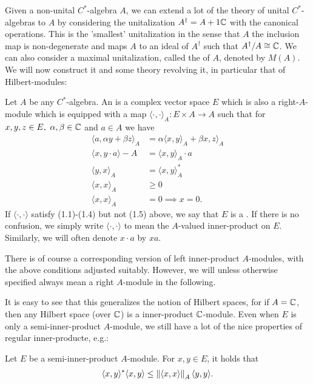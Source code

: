 Given a non-unital $C^*$-algebra $A$, we can extend a lot of the theory of unital $C^*$-algebras to $A$ by considering the unitalization $A^\dagger = A + 1\mathbb{C}$ with the canonical operations. This is the 'smallest' unitalization in the sense that $A$ the inclusion map is non-degenerate and maps $A$ to an ideal of $A^\dagger$ such that $A^\dagger/A \cong \mathbb{C}$. We can also consider a maximal unitalization, called the  of $A$, denoted by $M(A)$. We will now construct it and some theory revolving it, in particular that of Hilbert-modules:
\begin{definition}
	Let $A$ be any $C^*$-algebra. An  is a complex vector space $E$ which is also a right-$A$-module which is equipped with a map $\langle \cdot, \cdot\rangle_A \colon E \times A \to A$ such that for $x,y,z \in E, \ \alpha,\beta \in \mathbb{C}$ and $a \in A$ we have
	\begin{align}
		\langle a , \alpha y + \beta z \rangle_A &= \alpha \langle x,y\rangle_A+\beta x,z \rangle_A\\
		\langle x , y \cdot a \rangle-A &= \langle x,y\rangle_A \cdot a\\
		\langle y,x \rangle_A &= \langle x,y\rangle_A^*\\
		\langle x,x \rangle_A &\geq 0\\
		\langle x,x \rangle_A &= 0 \implies x = 0. 
	\end{align}
	If $\langle \cdot , \cdot \rangle$ satisfy (1.1)-(1.4) but not (1.5) above, we say that $E$ is a . If there is no confusion, we simply write $\langle \cdot, \cdot \rangle$ to mean the $A$-valued inner-product on $E$. Similarly, we will often denote $x \cdot a$ by $xa$. 

	There is of course a corresponding version of left inner-product $A$-modules, with the above conditions adjusted suitably. However, we will unless otherwise specified always mean a right $A$-module in the following.
	\label{mult:defmod}
\end{definition}
It is easy to see that this generalizes the notion of Hilbert spaces, for if $A= \mathbb{C}$, then any Hilbert space (over $\mathbb{C}$) is a inner-product $\mathbb{C}$-module. Even when $E$ is only a semi-inner-product $A$-module, we still have a lot of the nice properties of regular inner-producte, e.g.:
\begin{proposition}
Let $E$ be a semi-inner-product $A$-module. For $x,y \in E$, it holds that
\begin{align*}
	\langle x,y\rangle^* \langle x,y \rangle \leq \left\lVert \langle x , x \rangle \right\rVert_A \langle y , y \rangle.
\end{align*}
\end{proposition}
